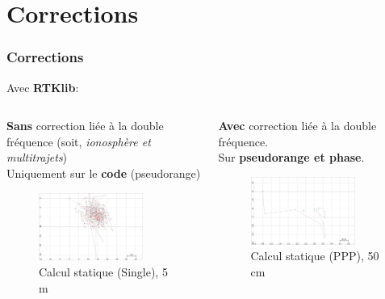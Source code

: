 \documentclass[xcolor=dvipsnames,envcountsect]{beamer}
\begin{document}
\section{Corrections}
\begin{frame}
	\frametitle{Corrections}
	Avec \textbf{RTKlib}:
	\newline
	\begin{columns}
		\begin{column}{0.5\textwidth}
			{\small \textbf{Sans} correction liée à la double fréquence (soit, \textit{ionosphère et multitrajets})\\
			Uniquement sur le \textbf{code} (pseudorange)}
			\begin{figure}
				\centering
				\includegraphics[width=0.8\textwidth]{./Figures/single_city.jpg}
				\caption {Calcul statique (Single), 5 m}
			\end{figure}
		\end{column}

		\begin{column}{0.5\textwidth}
			{\small \textbf{Avec} correction liée à la double fréquence. \cite{esa}\\
			Sur \textbf{pseudorange et phase}.}
			\begin{figure}
				\centering
				\includegraphics[width=0.8\textwidth]{./Figures/ppp_city.jpg}
				\caption {Calcul statique (PPP), 50 cm}
			\end{figure}
		\end{column}
	\end{columns}

\end{frame}
\end{document}
